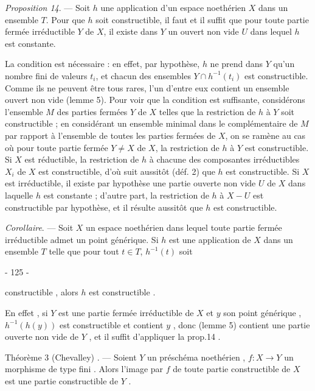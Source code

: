\emph{Proposition 14}. — Soit $h$ une application d'un espace noethérien $X$ dans un ensemble $T$. Pour que $h$ soit constructible, il faut et il suffit que pour toute partie fermée irréductible $Y$ de $X$, il existe dans $Y$ un ouvert non vide $U$ dans lequel $h$ est constante.

La condition est nécessaire : en effet, par hypothèse, $h$ ne prend dans $Y$ qu'un nombre fini de valeurs $t_i$, et chacun des ensembles $Y \cap h^{-1}(t_i)$ est constructible. Comme ils ne peuvent être tous rares, l'un d'entre eux contient un ensemble ouvert non vide (lemme 5). Pour voir que la condition est suffisante, considérons l'ensemble $M$ des parties fermées $Y$ de $X$ telles que la restriction de $h$ à $Y$ soit constructible ; en considérant un ensemble minimal dans le complémentaire de $M$ par rapport à l'ensemble de toutes les parties fermées de $X$, on se ramène au cas où pour toute partie fermée $Y \neq X$ de $X$, la restriction de $h$ à $Y$ est constructible. Si $X$ est réductible, la restriction de $h$ à chacune des composantes irréductibles $X_i$ de $X$ est constructible, d'où suit aussitôt (déf. 2) que $h$ est constructible. Si $X$ est irréductible, il existe par hypothèse une partie ouverte non vide $U$ de $X$ dans laquelle $h$ est constante ; d'autre part, la restriction de $h$ à $X-U$ est constructible par hypothèse, et il résulte aussitôt que $h$ est constructible.

\emph{Corollaire}. — Soit $X$ un espace noethérien dans lequel toute partie fermée irréductible admet un point générique. Si $h$ est une application de $X$ dans un ensemble $T$ telle que pour tout $t \in T$, $h^{-1}(t)$ soit

\newpage


- 125 -

constructible , alors $h$ est constructible .

En effet , si $Y$ est une partie fermée irréductible de $X$ et $y$ son point générique , $h^{-1}(h(y))$ est constructible et contient $y$ , donc (lemme 5) contient une partie ouverte non vide de $Y$ , et il suffit d'appliquer la prop.14 .

Théorème 3 (Chevalley) . — Soient $Y$ un préschéma noethérien , $f: X \to Y$ un morphisme de type fini . Alors l'image par $f$ de toute partie constructible de $X$ est une partie constructible de $Y$ .

